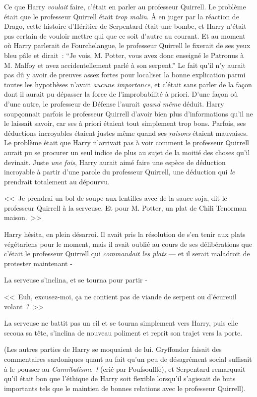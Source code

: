 Ce que Harry \emph{voulait} faire, c'était en parler au professeur Quirrell. Le problème était que le professeur Quirrell était \emph{trop malin}. À en juger par la réaction de Drago, cette histoire d'Héritier de Serpentard était une bombe, et Harry n'était pas certain de vouloir mettre qui que ce soit d'autre au courant. Et au moment où Harry parlerait de Fourchelangue, le professeur Quirrell le fixerait de ses yeux bleu pâle et dirait~: “Je vois, M. Potter, vous avez donc enseigné le Patronus à M. Malfoy et avez accidentellement parlé à son serpent.”
Le fait qu'il n'y aurait pas dû y avoir de preuves assez fortes pour localiser la bonne explication parmi toutes les hypothèses n'avait \emph{aucune importance}, et c'était sans parler de la façon dont il aurait pu dépasser la force de l'improbabilité à priori. D'une façon où d'une autre, le professeur de Défense l'aurait \emph{quand même} déduit. Harry soupçonnait parfois le professeur Quirrell d'avoir bien plus d'informations qu'il ne le laissait savoir, car ses à priori étaient tout simplement trop bons. Parfois, ses déductions incroyables étaient justes même quand ses \emph{raisons} étaient mauvaises. Le problème était que Harry n'arrivait pas à voir comment le professeur Quirrell aurait pu se procurer un seul indice de plus au sujet de la moitié des choses qu'il devinait. Juste \emph{une fois}, Harry aurait aimé faire une espèce de déduction incroyable à partir d'une parole du professeur Quirrell, une déduction qui \emph{le} prendrait totalement au dépourvu.

\later

<<~Je prendrai un bol de soupe aux lentilles avec de la sauce soja, dit le professeur Quirrell à la serveuse. Et pour M. Potter, un plat de Chili Tenorman maison.~>>

Harry hésita, en plein désarroi. Il avait pris la résolution de s'en tenir aux plats végétariens pour le moment, mais il avait oublié au cours de ses délibérations que c'était le professeur Quirrell qui \emph{commandait les plats} — et il serait maladroit de protester maintenant -

La serveuse s'inclina, et se tourna pour partir -

<<~Euh, excusez-moi, ça ne contient pas de viande de serpent ou d'écureuil volant~?~>>

La serveuse ne battit pas un cil et se tourna simplement vers Harry, puis elle secoua sa tête, s'inclina de nouveau poliment et reprit son trajet vers la porte.

(Les autres parties de Harry se moquaient de lui. Gryffondor faisait des commentaires sardoniques quant au fait qu'un peu de désagrément social suffisait à le pousser au \emph{Cannibalisme~!} (crié par Poufsouffle), et Serpentard remarquait qu'il était bon que l'éthique de Harry soit flexible lorsqu'il s'agissait de buts importants tels que le maintien de bonnes relations avec le professeur Quirrell).

